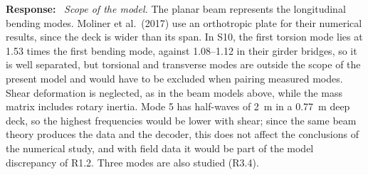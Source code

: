 \documentclass[11pt]{article}
\newenvironment{response}{\par\smallskip\noindent\color{resp}\textbf{Response:}\ }{\par}
\begin{document}
\begin{response}
\textit{Scope of the model.} The planar beam represents the longitudinal bending modes. Moliner et al.\ (2017) use an orthotropic plate for
their numerical results, since the deck is wider than its span. In S10, the first torsion mode lies at 1.53 times the first bending mode, against
1.08--1.12 in their girder bridges, so it is well separated, but torsional and transverse modes are outside the scope of the present
model and would have to be excluded when pairing measured modes. Shear deformation is neglected, as in the beam models above, while the mass
matrix includes rotary inertia. Mode 5 has half-waves of 2~m in a 0.77~m deep deck, so the highest frequencies would be lower with shear;
since the same beam theory produces the data and the decoder, this does not affect the conclusions of the numerical study, and with field data
it would be part of the model discrepancy of R1.2. Three modes are also studied (R3.4).


\end{response}
\end{document}
